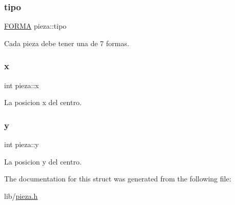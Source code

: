 \subsubsection{\texorpdfstring{tipo}{tipo}}
{\footnotesize\ttfamily \hyperlink{pieza_8h_adbcefcc94834b3c1042f11047ccd90ef}{F\+O\+R\+MA} pieza\+::tipo}

Cada pieza debe tener una de 7 formas. \mbox{\label{structpieza_a39b0a2d6772ef76714341486dadb0270}} 
\subsubsection{\texorpdfstring{x}{x}}
{\footnotesize\ttfamily int pieza\+::x}

La posicion x del centro. \mbox{\label{structpieza_a2cfe46c03638f670ad342054e680fc17}} 
\subsubsection{\texorpdfstring{y}{y}}
{\footnotesize\ttfamily int pieza\+::y}

La posicion y del centro. 

The documentation for this struct was generated from the following file\+:\begin{DoxyCompactItemize}
\item 
lib/\hyperlink{pieza_8h}{pieza.\+h}\end{DoxyCompactItemize}
